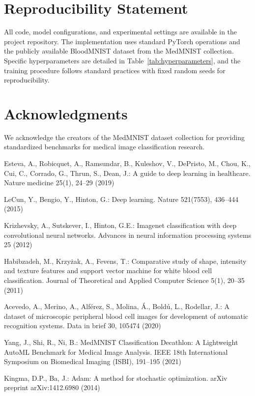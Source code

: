 \documentclass[runningheads]{llncs}
\begin{document}
\section*{Reproducibility Statement}

All code, model configurations, and experimental settings are available in the project repository. The implementation uses standard PyTorch operations and the publicly available BloodMNIST dataset from the MedMNIST collection. Specific hyperparameters are detailed in Table~\ref{tab:hyperparameters}, and the training procedure follows standard practices with fixed random seeds for reproducibility.

\section*{Acknowledgments}

We acknowledge the creators of the MedMNIST dataset collection for providing standardized benchmarks for medical image classification research.

\begin{thebibliography}{10}

Esteva, A., Robicquet, A., Ramsundar, B., Kuleshov, V., DePristo, M., Chou, K., Cui, C., Corrado, G., Thrun, S., Dean, J.:
A guide to deep learning in healthcare.
Nature medicine 25(1), 24--29 (2019)

LeCun, Y., Bengio, Y., Hinton, G.:
Deep learning.
Nature 521(7553), 436--444 (2015)

Krizhevsky, A., Sutskever, I., Hinton, G.E.:
Imagenet classification with deep convolutional neural networks.
Advances in neural information processing systems 25 (2012)

Habibzadeh, M., Krzy{\.z}ak, A., Fevens, T.:
Comparative study of shape, intensity and texture features and support vector machine for white blood cell classification.
Journal of Theoretical and Applied Computer Science 5(1), 20--35 (2011)

Acevedo, A., Merino, A., Alférez, S., Molina, Á., Boldú, L., Rodellar, J.:
A dataset of microscopic peripheral blood cell images for development of automatic recognition systems.
Data in brief 30, 105474 (2020)

Yang, J., Shi, R., Ni, B.:
MedMNIST Classification Decathlon: A Lightweight AutoML Benchmark for Medical Image Analysis.
IEEE 18th International Symposium on Biomedical Imaging (ISBI), 191--195 (2021)

Kingma, D.P., Ba, J.:
Adam: A method for stochastic optimization.
arXiv preprint arXiv:1412.6980 (2014)

\end{thebibliography}
\end{document}
